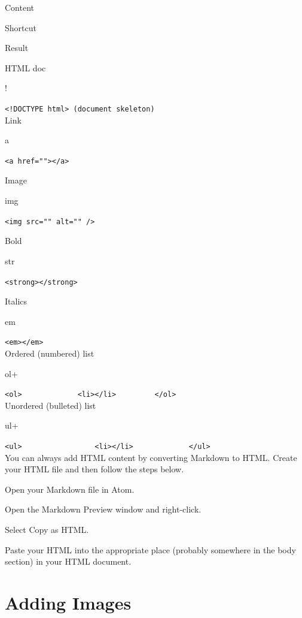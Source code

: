 \documentclass[]{book}
\theoremstyle{definition}
\theoremstyle{definition}
\theoremstyle{definition}
\theoremstyle{remark}
\begin{document}
Content

Shortcut

Result

HTML doc

!

\texttt{\textless{}!DOCTYPE\ html\textgreater{}\ (document\ skeleton)}\\

Link

a

\texttt{\textless{}a\ href=""\textgreater{}\textless{}/a\textgreater{}}

Image

img

\texttt{\textless{}img\ src=""\ alt=""\ /\textgreater{}}

Bold

str

\texttt{\textless{}strong\textgreater{}\textless{}/strong\textgreater{}}

Italics

em

\texttt{\textless{}em\textgreater{}\textless{}/em\textgreater{}}\\

Ordered (numbered) list

ol+

\texttt{\textless{}ol\textgreater{}\ \ \ \ \ \ \ \ \ \ \ \ \ \textless{}li\textgreater{}\textless{}/li\textgreater{}\ \ \ \ \ \ \ \ \ \textless{}/ol\textgreater{}}\\

Unordered (bulleted) list

ul+

\texttt{\textless{}ul\textgreater{}\ \ \ \ \ \ \ \ \ \ \ \ \ \ \ \ \ \textless{}li\textgreater{}\textless{}/li\textgreater{}\ \ \ \ \ \ \ \ \ \ \ \ \ \textless{}/ul\textgreater{}}\\

You can always add HTML content by converting Markdown to HTML. Create
your HTML file and then follow the steps below.

Open your Markdown file in Atom.

Open the Markdown Preview window and right-click.

Select Copy as HTML.

Paste your HTML into the appropriate place (probably somewhere in the
body section) in your HTML document.

\hypertarget{adding-images}{%
\section{Adding Images}\label{adding-images}}
\end{document}
